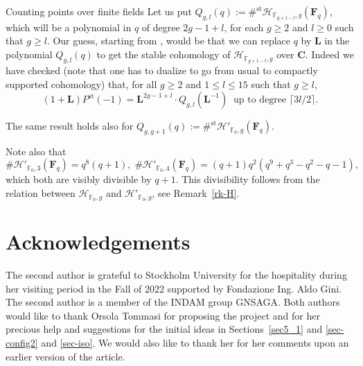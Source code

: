 \documentclass[10pt,a4paper,twoside]{amsart}
\theoremstyle{plain}
\theoremstyle{definition}
\theoremstyle{remark}
\begin{document}
\begin{subsection}{Counting points over finite fields}
Let us put $Q_{g,l}(q):=\#^{\mathrm{st}} \mathcal{H}_{\mathbb{F}_{g+1-l},g}(\mathbf F_q)$, which will be a polynomial in $q$ of degree $2g-1+l$, for each $g\geq 2$ and $l\geq 0$ such that $g \geq l$. 
Our guess, starting from \cite[Theorem 2.1.8]{HRV}, would be that we can replace $q$ by $\mathbf L$ in the polynomial $Q_{g,l}(q)$ to get the stable cohomology of $\mathcal{H}_{\mathbb{F}_{g+1-l},g}$ over $\mathbf C$. 
Indeed we have checked (note that one has to dualize to go from usual to compactly supported cohomology) that, for all $g \geq 2$ and $1 \leq l \leq 15$ such that $g \geq l$, 
\[
(1+\mathbf L)P^{\mathrm{st}}(-1)=
\mathbf{L}^{2g-1+l} \cdot Q_{g,l}(\mathbf{L}^{-1}) \;\; \text{up to degree } \lceil 3l/2 \rceil.
\]

The same result holds also for $Q_{g,g+1}(q):=\#^{\mathrm{st}} \mathcal{H}'_{\mathbb{F}_0,g}(\mathbf F_q)$. 

Note also that 
\[
\# \mathcal{H}'_{\mathbb{F}_0,3}(\mathbf F_q)=q^8(q+1), \; \# \mathcal{H}'_{\mathbb{F}_0,4}(\mathbf F_q)=(q+1) q^2 (q^9+q^3-q^2-q-1),
\]
which both are visibly divisible by $q+1$. This divisibility follows 
from the relation between $\mathcal{H}_{\mathbb{F}_0,g}$ and $\mathcal{H}'_{\mathbb{F}_0,g}$, see Remark~\ref{rk-H}. 
\end{subsection}



\section*{Acknowledgements}
The second author is grateful to Stockholm University for the hospitality during her visiting period in the Fall of 2022 supported by Fondazione Ing. Aldo Gini. The second author is a member of the INDAM group GNSAGA.
Both authors would like to thank Orsola Tommasi for proposing the project and for her precious help and suggestions for the initial ideas in Sections~\ref{sec5_1} and \ref{sec-config2} and \ref{sec-iso}. We would also like to thank her for her comments upon an earlier version of the article.


\end{document}
